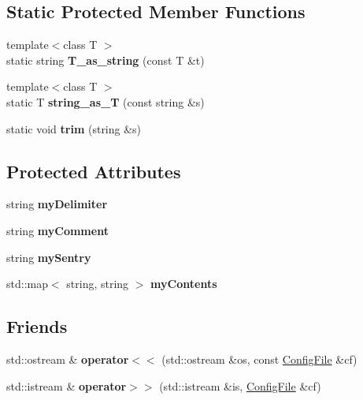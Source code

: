 \subsection*{Static Protected Member Functions}
\begin{DoxyCompactItemize}
\item 
\mbox{\label{class_config_file_a9855bff7ed5af9aa408ac06fc7ab4c09}} 
{\footnotesize template$<$class T $>$ }\\static string {\bfseries T\+\_\+as\+\_\+string} (const T \&t)
\item 
\mbox{\label{class_config_file_a59c6ab56cdfa23a29a38bf3eea1ededf}} 
{\footnotesize template$<$class T $>$ }\\static T {\bfseries string\+\_\+as\+\_\+T} (const string \&s)
\item 
\mbox{\label{class_config_file_a6b445b393fcf42386a804fc4077fac10}} 
static void {\bfseries trim} (string \&s)
\end{DoxyCompactItemize}
\subsection*{Protected Attributes}
\begin{DoxyCompactItemize}
\item 
\mbox{\label{class_config_file_ad63f3e259f665192b64fb3e83c701425}} 
string {\bfseries my\+Delimiter}
\item 
\mbox{\label{class_config_file_a2c60a141e8ad012b86a0642ec8ec638d}} 
string {\bfseries my\+Comment}
\item 
\mbox{\label{class_config_file_af066ec1942c50848a055350029ebbca5}} 
string {\bfseries my\+Sentry}
\item 
\mbox{\label{class_config_file_a91b9b9e241d42bd3b1bb8b3e6355761f}} 
std\+::map$<$ string, string $>$ {\bfseries my\+Contents}
\end{DoxyCompactItemize}
\subsection*{Friends}
\begin{DoxyCompactItemize}
\item 
\mbox{\label{class_config_file_a8ccacbc37db1992a5515e2c72fc83ce6}} 
std\+::ostream \& {\bfseries operator$<$$<$} (std\+::ostream \&os, const \hyperlink{class_config_file}{Config\+File} \&cf)
\item 
\mbox{\label{class_config_file_a25042475439039e70f90febe7d0e63ec}} 
std\+::istream \& {\bfseries operator$>$$>$} (std\+::istream \&is, \hyperlink{class_config_file}{Config\+File} \&cf)
\end{DoxyCompactItemize}


